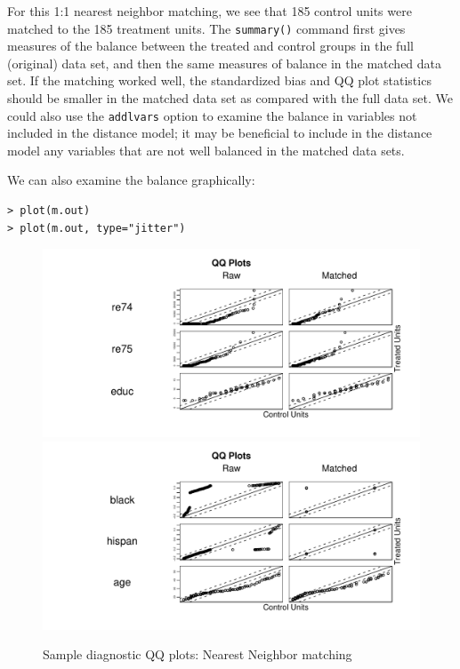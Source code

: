 \documentclass[oneside,letterpaper,titlepage]{article}
\begin{document}
For this 1:1 nearest neighbor matching, we see that 185 control units
were matched to the 185 treatment units.  The \texttt{summary()}
command first gives measures of the balance between the treated and
control groups in the full (original) data set, and then the same
measures of balance in the matched data set.  If the matching worked
well, the standardized bias and QQ plot statistics should be smaller
in the matched data set as compared with the full data set.  We could
also use the \texttt{addlvars} option to examine the balance in
variables not included in the distance model; it may be beneficial to
include in the distance model any variables that are not well balanced
in the matched data sets.

We can also examine the balance graphically:

\begin{verbatim}
> plot(m.out)
> plot(m.out, type="jitter")
\end{verbatim}

\begin{figure}[tbp]
  \begin{center}
    {\includegraphics[scale=0.5]{figs/qqplotnn}}
    {\includegraphics[scale=0.5]{figs/qqplotnn2}}
    \hfill
    \caption{Sample diagnostic QQ plots: Nearest Neighbor matching}
\label{diagqqnn}
\end{center}
\end{figure}
\end{document}

